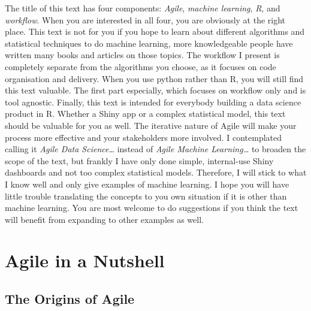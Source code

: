 \documentclass[]{book}
\begin{document}
The title of this text has four components: \emph{Agile}, \emph{machine learning}, \emph{R}, and \emph{workflow}. When you are interested in all four, you are obviously at the right place. This text is not for you if you hope to learn about different algorithms and statistical techniques to do machine learning, more knowledgeable people have written many books and articles on those topics. The workflow I present is completely separate from the algorithms you choose, as it focuses on code organisation and delivery. When you use python rather than R, you will still find this text valuable. The first part especially, which focuses on workflow only and is tool agnostic. Finally, this text is intended for everybody building a data science product in R. Whether a Shiny app or a complex statistical model, this text should be valuable for you as well. The iterative nature of Agile will make your process more effective and your stakeholders more involved. I contemplated calling it \emph{Agile Data Science\ldots{}} instead of \emph{Agile Machine Learning\ldots{}} to broaden the scope of the text, but frankly I have only done simple, internal-use Shiny dashboards and not too complex statistical models. Therefore, I will stick to what I know well and only give examples of machine learning. I hope you will have little trouble translating the concepts to you own situation if it is other than machine learning. You are most welcome to do suggestions if you think the text will benefit from expanding to other examples as well.

\hypertarget{agile-in-a-nutshell}{%
\chapter{Agile in a Nutshell}\label{agile-in-a-nutshell}}

\hypertarget{the-origins-of-agile}{%
\section{The Origins of Agile}\label{the-origins-of-agile}}
\end{document}
